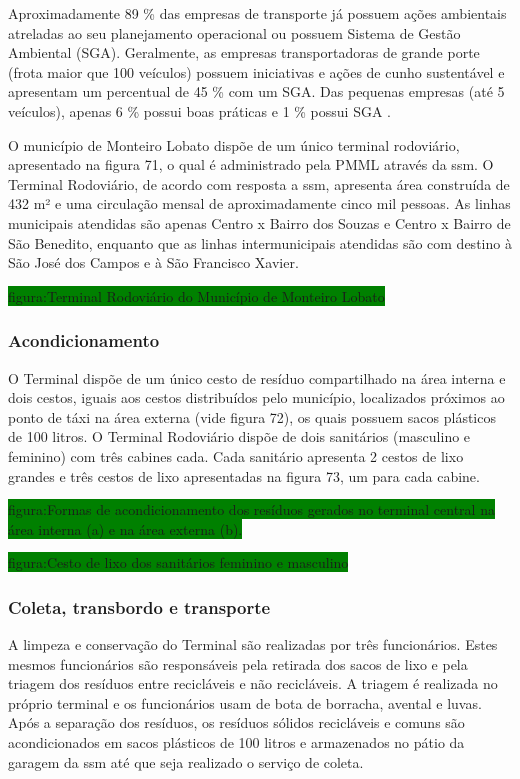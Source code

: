 	Aproximadamente 89 \% das empresas de transporte já possuem ações ambientais atreladas ao seu planejamento operacional ou possuem Sistema de Gestão Ambiental (SGA). Geralmente, as empresas transportadoras de grande porte (frota maior que 100 veículos) possuem iniciativas e ações de cunho sustentável e apresentam um percentual de 45 \% com um SGA. Das pequenas empresas (até 5 veículos), apenas 6 \% possui boas práticas e 1 \% possui SGA \cite{Paixao2011}.
	
	O município de Monteiro Lobato dispõe de um único terminal rodoviário, apresentado na figura 71, o qual é administrado pela PMML através da \gls{ssm}. O Terminal Rodoviário, de acordo com resposta a \gls{ssm}, apresenta área construída de 432 m² e uma circulação mensal de aproximadamente cinco mil pessoas. As linhas municipais atendidas são apenas Centro x Bairro dos Souzas e Centro x Bairro de São Benedito, enquanto que as linhas intermunicipais atendidas são com destino à São José dos Campos e à São Francisco Xavier.
	
	\colorbox{green}{figura:Terminal Rodoviário do Município de Monteiro Lobato}
	
	\subsubsection{Acondicionamento}
	O Terminal dispõe de um único cesto de resíduo compartilhado na área interna e dois cestos, iguais aos cestos distribuídos pelo município, localizados próximos ao ponto de táxi na área externa (vide figura 72), os quais possuem sacos plásticos de 100 litros. O Terminal Rodoviário dispõe de dois sanitários (masculino e feminino) com três cabines cada. Cada sanitário apresenta 2 cestos de lixo grandes e três cestos de lixo apresentadas na figura 73, um para cada cabine.
	
	\colorbox{green}{figura:Formas de acondicionamento dos resíduos gerados no terminal central na área interna (a) e na área externa (b).}
	
	\colorbox{green}{figura:Cesto de lixo dos sanitários feminino e masculino}
	
	\subsubsection{Coleta, transbordo e transporte}
	A limpeza e conservação do Terminal são realizadas por três funcionários. Estes mesmos funcionários são responsáveis pela retirada dos sacos de lixo e pela triagem dos resíduos entre recicláveis e não recicláveis. A triagem é realizada no próprio terminal e os funcionários usam de bota de borracha, avental e luvas. Após a separação dos resíduos, os resíduos sólidos recicláveis e comuns são acondicionados em sacos plásticos de 100 litros e armazenados no pátio da garagem da \gls{ssm} até que seja realizado o serviço de coleta.
	
